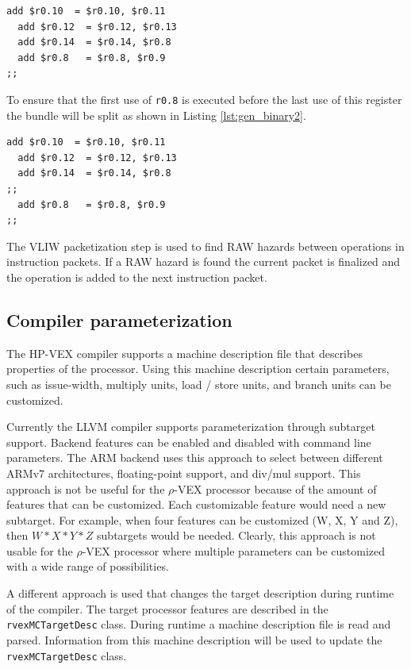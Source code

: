 \begin{lstlisting}[language=rvex, label=lst:gen_binary, caption={Regular $\rho$-VEX binary.}]
  add $r0.10  = $r0.10, $r0.11
  add $r0.12  = $r0.12, $r0.13
  add $r0.14  = $r0.14, $r0.8
  add $r0.8   = $r0.8, $r0.9
;; 
\end{lstlisting}

To ensure that the first use of \texttt{r0.8} is executed before the last use of this register the bundle will be split as shown in Listing \ref{lst:gen_binary2}.

\begin{lstlisting}[language=rvex, label=lst:gen_binary2, caption={Generic $\rho$-VEX binary.}]
  add $r0.10  = $r0.10, $r0.11
  add $r0.12  = $r0.12, $r0.13
  add $r0.14  = $r0.14, $r0.8
;;
  add $r0.8   = $r0.8, $r0.9
;; 
\end{lstlisting}

The VLIW packetization step is used to find RAW hazards between operations in instruction packets. If a RAW hazard is found the current packet is finalized and the operation is added to the next instruction packet.

\subsection{Compiler parameterization}
The HP-VEX compiler supports a machine description file that describes properties of the processor. Using this machine description certain parameters, such as issue-width, multiply units, load / store units, and branch units can be customized. 

Currently the LLVM compiler supports parameterization through subtarget support. Backend features can be enabled and disabled with command line parameters. The ARM backend uses this approach to select between different ARMv7 architectures, floating-point support, and div/mul support. This approach is not be useful for the $\rho$-VEX processor because of the amount of features that can be customized. Each customizable feature would need a new subtarget. For example, when four features can be customized (W, X, Y and Z), then $W*X*Y*Z$ subtargets would be needed. Clearly, this approach is not usable for the $\rho$-VEX processor where multiple parameters can be customized with a wide range of possibilities.

A different approach is used that changes the target description during runtime of the compiler. The target processor features are described in the \texttt{rvexMCTargetDesc} class. During runtime a machine description file is read and parsed. Information from this machine description will be used to update the \texttt{rvexMCTargetDesc} class. 

